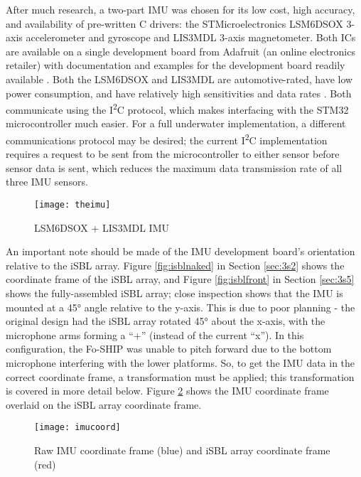 \documentclass[12pt,a4paper]{report}
\begin{document}
After much research, a two-part IMU was chosen for its low cost, high accuracy, and availability of pre-written C drivers: the STMicroelectronics LSM6DSOX 3-axis accelerometer and gyroscope and LIS3MDL 3-axis magnetometer. Both ICs are available on a single development board from Adafruit (an online electronics retailer) with documentation and examples for the development board readily available \cite{adafruit}. Both the LSM6DSOX and LIS3MDL are automotive-rated, have low power consumption, and have relatively high sensitivities and data rates \cite{lsm6dsox} \cite{lis3mdl}. Both communicate using the I\textsuperscript{2}C protocol, which makes interfacing with the STM32 microcontroller much easier. For a full underwater implementation, a different communications protocol may be desired; the current I\textsuperscript{2}C implementation requires a request to be sent from the microcontroller to either sensor before sensor data is sent, which reduces the maximum data transmission rate of all three IMU sensors.

\begin{figure}[htbp]
	\centering
	\texttt{[image: theimu]}
	\caption{LSM6DSOX + LIS3MDL IMU \cite{adafruit}}
	\label{fig:theimu}
\end{figure}

An important note should be made of the IMU development board’s orientation relative to the iSBL array. Figure \ref{fig:isblnaked} in Section \ref{sec:3s2} shows the coordinate frame of the iSBL array, and Figure \ref{fig:isblfront} in Section \ref{sec:3s5} shows the fully-assembled iSBL array; close inspection shows that the IMU is mounted at a 45° angle relative to the y-axis. This is due to poor planning - the original design had the iSBL array rotated 45° about the x-axis, with the microphone arms forming a “+” (instead of the current “x”). In this configuration, the Fo-SHIP was unable to pitch forward due to the bottom microphone interfering with the lower platforms. So, to get the IMU data in the correct coordinate frame, a transformation must be applied; this transformation is covered in more detail below. Figure \ref{fig:imucoord} shows the IMU coordinate frame overlaid on the iSBL array coordinate frame.

\begin{figure}[htbp]
	\centering
	\texttt{[image: imucoord]}
	\caption{Raw IMU coordinate frame (blue) and iSBL array coordinate frame (red)}
	\label{fig:imucoord}
\end{figure}
\end{document}
